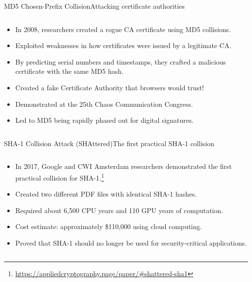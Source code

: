 \documentclass[aspectratio=169, lualatex, handout]{beamer}
\begin{document}
\begin{frame}{MD5 Chosen-Prefix Collision}{Attacking certificate authorities}
	\begin{columns}[c]
		\begin{column}{1\textwidth}
			\begin{itemize}[<+->]
				\item In 2008, researchers created a rogue CA certificate using MD5 collisions.
				\item Exploited weaknesses in how certificates were issued by a legitimate CA.
				\item By predicting serial numbers and timestamps, they crafted a malicious certificate with the same MD5 hash.
				\item Created a fake Certificate Authority that browsers would trust!
				\item Demonstrated at the 25th Chaos Communication Congress.
				\item Led to MD5 being rapidly phased out for digital signatures.
			\end{itemize}
		\end{column}
	\end{columns}
\end{frame}

\begin{frame}{SHA-1 Collision Attack (SHAttered)}{The first practical SHA-1 collision}
	\begin{columns}[c]
		\begin{column}{1\textwidth}
			\begin{itemize}[<+->]
				\item In 2017, Google and CWI Amsterdam researchers demonstrated the first practical collision for SHA-1.\footnote{\url{https://appliedcryptography.page/paper/\#shattered-sha1}}
				\item Created two different PDF files with identical SHA-1 hashes.
				\item Required about 6,500 CPU years and 110 GPU years of computation.
				\item Cost estimate: approximately \$110,000 using cloud computing.
				\item Proved that SHA-1 should no longer be used for security-critical applications.
			\end{itemize}
		\end{column}
	\end{columns}
\end{frame}
\end{document}
